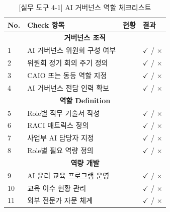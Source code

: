 \begin{table}[htbp]
\centering
\caption{[실무 도구 4-1] AI 거버넌스 역할 체크리스트}
\label{tab:role_checklist}
\begin{tabularx}{\textwidth}{|p{0.5cm}|p{5cm}|X|p{1.5cm}|}
\hline
\textbf{No.} & \textbf{Check 항목} & \textbf{현황} & \textbf{결과} \\
\hline
\multicolumn{4}{|c|}{\textbf{거버넌스 조직}} \\
\hline
1 & AI 거버넌스 위원회 구성 여부 & & $\checkmark$ / $\times$ \\
\hline
2 & 위원회 정기 회의 주기 정의 & & $\checkmark$ / $\times$ \\
\hline
3 & CAIO 또는 동등 역할 지정 & & $\checkmark$ / $\times$ \\
\hline
4 & AI 거버넌스 전담 인력 확보 & & $\checkmark$ / $\times$ \\
\hline
\multicolumn{4}{|c|}{\textbf{역할 Definition}} \\
\hline
5 & Role별 직무 기술서 작성 & & $\checkmark$ / $\times$ \\
\hline
6 & RACI 매트릭스 정의 & & $\checkmark$ / $\times$ \\
\hline
7 & 사업부 AI 담당자 지정 & & $\checkmark$ / $\times$ \\
\hline
8 & Role별 필요 역량 정의 & & $\checkmark$ / $\times$ \\
\hline
\multicolumn{4}{|c|}{\textbf{역량 개발}} \\
\hline
9 & AI 윤리 교육 프로그램 운영 & & $\checkmark$ / $\times$ \\
\hline
10 & 교육 이수 현황 관리 & & $\checkmark$ / $\times$ \\
\hline
11 & 외부 전문가 자문 체계 & & $\checkmark$ / $\times$ \\
\hline
\end{tabularx}
\end{table}


